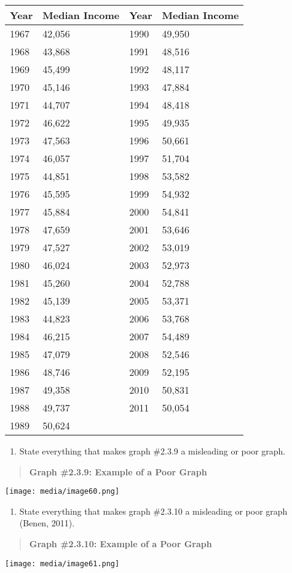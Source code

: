 \documentclass[]{book}
\providecommand{\tightlist}{%
  \setlength{\itemsep}{0pt}\setlength{\parskip}{0pt}}
\begin{document}
\begin{longtable}[]{@{}llll@{}}
\toprule
Year & Median Income & Year & Median Income\tabularnewline
\midrule
\endhead
1967 & 42,056 & 1990 & 49,950\tabularnewline
1968 & 43,868 & 1991 & 48,516\tabularnewline
1969 & 45,499 & 1992 & 48,117\tabularnewline
1970 & 45,146 & 1993 & 47,884\tabularnewline
1971 & 44,707 & 1994 & 48,418\tabularnewline
1972 & 46,622 & 1995 & 49,935\tabularnewline
1973 & 47,563 & 1996 & 50,661\tabularnewline
1974 & 46,057 & 1997 & 51,704\tabularnewline
1975 & 44,851 & 1998 & 53,582\tabularnewline
1976 & 45,595 & 1999 & 54,932\tabularnewline
1977 & 45,884 & 2000 & 54,841\tabularnewline
1978 & 47,659 & 2001 & 53,646\tabularnewline
1979 & 47,527 & 2002 & 53,019\tabularnewline
1980 & 46,024 & 2003 & 52,973\tabularnewline
1981 & 45,260 & 2004 & 52,788\tabularnewline
1982 & 45,139 & 2005 & 53,371\tabularnewline
1983 & 44,823 & 2006 & 53,768\tabularnewline
1984 & 46,215 & 2007 & 54,489\tabularnewline
1985 & 47,079 & 2008 & 52,546\tabularnewline
1986 & 48,746 & 2009 & 52,195\tabularnewline
1987 & 49,358 & 2010 & 50,831\tabularnewline
1988 & 49,737 & 2011 & 50,054\tabularnewline
1989 & 50,624 & &\tabularnewline
\bottomrule
\end{longtable}

\begin{enumerate}
\def\labelenumi{\arabic{enumi}.}
\setcounter{enumi}{10}
\tightlist
\item
  State everything that makes graph \#2.3.9 a misleading or poor
  graph.
\end{enumerate}

\begin{quote}
\textbf{Graph \#2.3.9: Example of a Poor Graph}
\end{quote}

\texttt{[image: media/image60.png]}

\begin{enumerate}
\def\labelenumi{\arabic{enumi}.}
\setcounter{enumi}{11}
\tightlist
\item
  State everything that makes graph \#2.3.10 a misleading or poor
  graph (Benen, 2011).
\end{enumerate}

\begin{quote}
\textbf{Graph \#2.3.10: Example of a Poor Graph}
\end{quote}

\texttt{[image: media/image61.png]}
\end{document}
